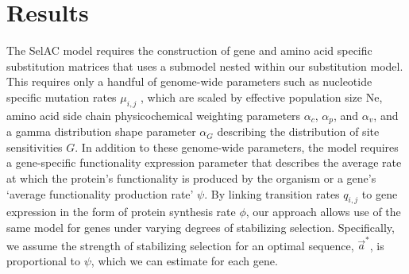 \documentclass[onecolumn,letterpaper,fleqn,nogrid]{myMBE}%
\newcommand{\selac}{SelAC\xspace}
\newcommand{\alphac}{\ensuremath{\alpha_c}\xspace}
\newcommand{\alphag}{\ensuremath{\alpha_G}\xspace}
\newcommand{\alphap}{\ensuremath{\alpha_p}\xspace}
\newcommand{\alphav}{\ensuremath{\alpha_v}\xspace}
\newcommand{\aoptvec}{\ensuremath{\Vec{a}^*}\xspace}
\newcommand{\muij}{\ensuremath{\mu_{i,j}}\xspace}
\newcommand{\qij}{\ensuremath{q_{i,j}}\xspace}
\begin{document}
\section{Results}
The \selac model requires the construction of gene and amino acid specific substitution matrices that uses a submodel nested within our substitution model.
This requires only a handful of genome-wide parameters such as nucleotide specific mutation rates $\muij$ , which are scaled by effective population size Ne, amino acid side chain physicochemical weighting parameters \alphac, \alphap, and \alphav, and a gamma distribution shape parameter \alphag describing the distribution of site sensitivities $G$.
In addition to these genome-wide parameters, the model requires a gene-specific functionality expression parameter that describes the average rate at which the protein's functionality is produced by the organism or a gene's `average functionality production rate' $\psi$.
By linking transition rates $\qij$ to gene expression in the form of protein synthesis rate $\phi$, our approach allows use of the same model for genes under varying degrees of stabilizing selection.
Specifically, we assume the strength of stabilizing selection for an optimal sequence, \aoptvec, is proportional to $\psi$, which we can estimate for each gene.
\end{document}
